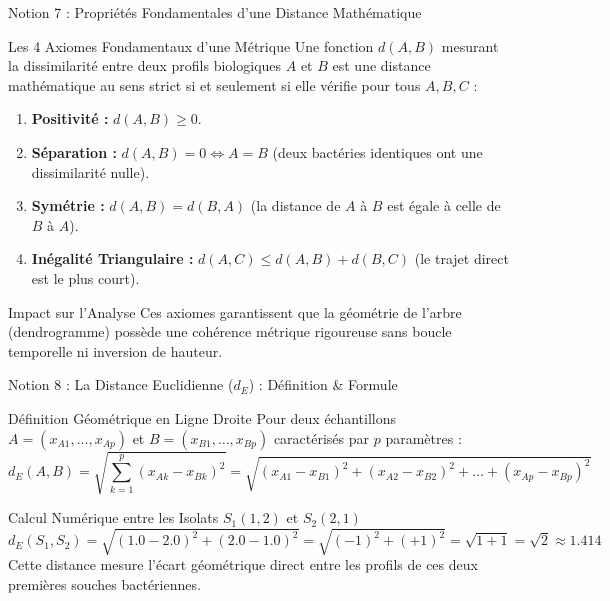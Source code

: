 \documentclass[aspectratio=169,10pt]{beamer}
\begin{document}
\begin{frame}{Notion 7 : Propriétés Fondamentales d'une Distance Mathématique}
  \begin{conceptbox}{Les 4 Axiomes Fondamentaux d'une Métrique}
    \footnotesize
    Une fonction $d(A, B)$ mesurant la dissimilarité entre deux profils biologiques $A$ et $B$ est une distance mathématique au sens strict si et seulement si elle vérifie pour tous $A, B, C$ :
    \begin{enumerate}
      \item \textbf{Positivité :} $d(A, B) \ge 0$.
      \item \textbf{Séparation :} $d(A, B) = 0 \iff A = B$ (deux bactéries identiques ont une dissimilarité nulle).
      \item \textbf{Symétrie :} $d(A, B) = d(B, A)$ (la distance de $A$ à $B$ est égale à celle de $B$ à $A$).
      \item \textbf{Inégalité Triangulaire :} $d(A, C) \le d(A, B) + d(B, C)$ (le trajet direct est le plus court).
    \end{enumerate}
  \end{conceptbox}
  \vspace{1mm}
  \begin{takeawaybox}{Impact sur l'Analyse}
    \footnotesize
    Ces axiomes garantissent que la géométrie de l'arbre (dendrogramme) possède une cohérence métrique rigoureuse sans boucle temporelle ni inversion de hauteur.
  \end{takeawaybox}
\end{frame}

\begin{frame}{Notion 8 : La Distance Euclidienne ($d_E$) : Définition \& Formule}
  \begin{conceptbox}{Définition Géométrique en Ligne Droite}
    \footnotesize
    Pour deux échantillons $A = (x_{A1}, \dots, x_{Ap})$ et $B = (x_{B1}, \dots, x_{Bp})$ caractérisés par $p$ paramètres :
    \begin{equation*}
      d_E(A, B) = \sqrt{\sum_{k=1}^p (x_{Ak} - x_{Bk})^2} = \sqrt{(x_{A1} - x_{B1})^2 + (x_{A2} - x_{B2})^2 + \dots + (x_{Ap} - x_{Bp})^2}
    \end{equation*}
  \end{conceptbox}
  \vspace{1mm}
  \begin{biobox}{Calcul Numérique entre les Isolats $S_1(1,2)$ et $S_2(2,1)$}
    \footnotesize
    \begin{equation*}
      d_E(S_1, S_2) = \sqrt{(1.0 - 2.0)^2 + (2.0 - 1.0)^2} = \sqrt{(-1)^2 + (+1)^2} = \sqrt{1 + 1} = \sqrt{2} \approx \mathbf{1.414}
    \end{equation*}
    Cette distance mesure l'écart géométrique direct entre les profils de ces deux premières souches bactériennes.
  \end{biobox}
\end{frame}
\end{document}
